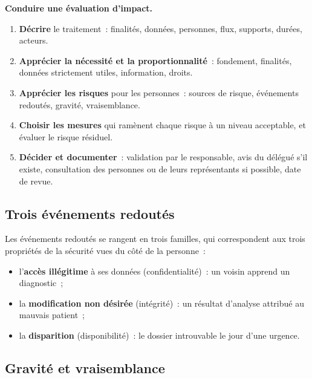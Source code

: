 \begin{boxprocedure}
\textbf{Conduire une évaluation d'impact.}
\begin{enumerate}
    \item \textbf{Décrire} le traitement~: finalités, données, personnes,
          flux, supports, durées, acteurs.
    \item \textbf{Apprécier la nécessité et la proportionnalité}~: fondement,
          finalités, données strictement utiles, information, droits.
    \item \textbf{Apprécier les risques} pour les personnes~: sources de
          risque, événements redoutés, gravité, vraisemblance.
    \item \textbf{Choisir les mesures} qui ramènent chaque risque à un niveau
          acceptable, et évaluer le risque résiduel.
    \item \textbf{Décider et documenter}~: validation par le responsable,
          avis du délégué s'il existe, consultation des personnes ou de
          leurs représentants si possible, date de revue.
\end{enumerate}
\end{boxprocedure}

\subsection{Trois événements redoutés}

Les événements redoutés se rangent en trois familles, qui correspondent aux
trois propriétés de la sécurité vues du côté de la personne~:
\begin{itemize}
    \item l'\textbf{accès illégitime} à ses données (confidentialité)~: un
          voisin apprend un diagnostic~;
    \item la \textbf{modification non désirée} (intégrité)~: un résultat
          d'analyse attribué au mauvais patient~;
    \item la \textbf{disparition} (disponibilité)~: le dossier introuvable le
          jour d'une urgence.
\end{itemize}

\subsection{Gravité et vraisemblance}

